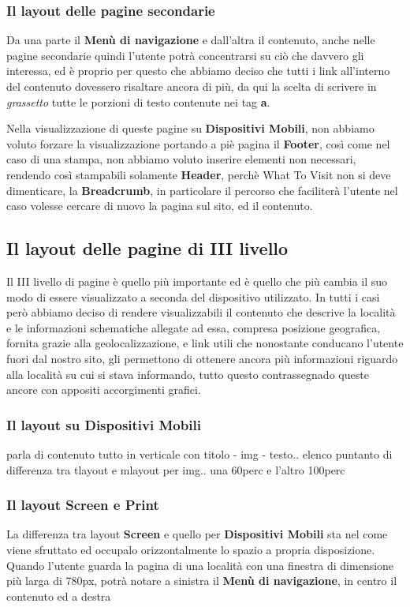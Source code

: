 \subsubsection{Il layout delle pagine secondarie}\label{sec:Pres-IIliv-sec}
Da una parte il \textbf{Menù di navigazione} e dall'altra il contenuto, anche nelle pagine secondarie quindi l'utente potrà concentrarsi su ciò che davvero gli interessa, ed è proprio per questo che abbiamo deciso che tutti i link all'interno del contenuto dovessero risaltare ancora di più, da qui la scelta di scrivere in \textit{grassetto} tutte le porzioni di testo contenute nei tag \textbf{a}.

Nella visualizzazione di queste pagine su \textbf{Dispositivi Mobili}, non abbiamo voluto forzare la visualizzazione portando a piè pagina il \textbf{Footer}, così come nel caso di una stampa, non abbiamo voluto inserire elementi non necessari, rendendo così stampabili solamente \textbf{Header}, perchè What To Visit non si deve dimenticare, la \textbf{Breadcrumb}, in particolare il percorso che faciliterà l'utente nel caso volesse cercare di nuovo la pagina sul sito, ed il contenuto.

\subsection{Il layout delle pagine di III livello}\label{sec:Pres-IIIliv}
Il III livello di pagine è quello più importante ed è quello che più cambia il suo modo di essere visualizzato a seconda del dispositivo utilizzato.
In tutti i casi però abbiamo deciso di rendere visualizzabili il contenuto che descrive la località e le informazioni schematiche allegate ad essa, compresa posizione geografica, fornita grazie alla geolocalizzazione, e link utili che nonostante conducano l'utente fuori dal nostro sito, gli permettono di ottenere ancora più informazioni riguardo alla località su cui si stava informando, tutto questo contrassegnado queste ancore con appositi accorgimenti grafici.

\subsubsection{Il layout su Dispositivi Mobili}\label{sec:Pres-IIliv-sec}
parla di contenuto tutto in verticale con titolo - img - testo..
elenco puntanto di differenza tra tlayout e mlayout per img.. una 60perc e l'altro 100perc






\subsubsection{Il layout Screen e Print}\label{sec:Pres-IIliv-sec}
La differenza tra layout \textbf{Screen} e quello per \textbf{Dispositivi Mobili} sta nel come viene sfruttato ed occupalo orizzontalmente lo spazio a propria disposizione.
Quando l'utente guarda la pagina di una località con una finestra di dimensione più larga di 780px, potrà notare a sinistra il \textbf{Menù di navigazione}, in centro il contenuto ed a destra